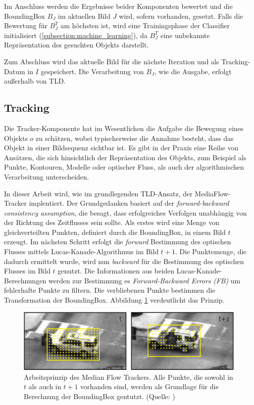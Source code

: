 	Im Anschluss werden die Ergebnisse beider Komponenten bewertet und die BoundingBox $B_J$ im aktuellen Bild $J$ wird, sofern vorhanden, gesetzt. Falls die Bewertung für $B_J^T$ am höchsten ist, wird eine Trainingsphase der Classifier initialisiert (\ref{subsection:machine_learning}), da $B_J^T$ eine unbekannte Repräsentation des gesuchten Objekts darstellt.

	Zum Abschluss wird das aktuelle Bild für die nächste Iteration und als Tracking-Datum in $I$ gespeichert. Die Verarbeitung von $B_J$, wie die Ausgabe, erfolgt außerhalb von TLD.

	\subsection{Tracking}
	\label{subsection:tracking}
	Die Tracker-Komponente hat im Wesentlichen die Aufgabe die Bewegung eines Objekts $o$ zu schätzen, wobei typischerweise die Annahme besteht, dass das Objekt in einer Bildsequenz sichtbar ist. Es gibt in der Praxis eine Reihe von Ansätzen, die sich hinsichtlich der Repräsentation des Objekts, zum Beispiel als Punkte, Kontouren, Modelle oder optischer Fluss, als auch der algorithmischen Verarbeitung unterscheiden.

	In dieser Arbeit wird, wie im grundlegenden TLD-Ansatz, der MediaFlow- Tracker \cite{MFT} implentiert. Der Grundgedanken basiert auf der\textit{ forward-backward consistency assumption}, die besagt, dass erfolgreiches Verfolgen unabhängig von der Richtung des Zeitflusses sein sollte. Als erstes wird eine Menge von gleichverteilten Punkten, definiert durch die BoundingBox, in einem Bild $t$ erzeugt. Im nächsten Schritt erfolgt die \textit{forward} Bestimmung des optischen Flusses mittels Lucas-Kanade-Algorithmus \cite{OPT} im Bild $t+1$. Die Punktemenge, die dadurch ermittelt wurde, wird nun \textit{backward} für die Bestimmung des optischen Flusses im Bild $t$ genutzt. Die Informationen aus beiden Lucas-Kanade-Berechnungen werden zur Bestimmung es \textit{Forward-Backward Errors (FB)} um fehlerhafte Punkte zu filtern. Die verbliebenen Punkte bestimmen die Transformation der BoundingBox. Abbildung \ref{fig:MFT} verdeutlicht das Prinzip.

	\begin{figure}
	\centering{}\includegraphics[scale=0.7]{../pictures/MediaFlow_0.png}\caption[Arbeitsweise des Median Flow Trackers]{Arbeitsprinzip des Median Flow Trackers. Alle Punkte, die sowohl in $t$ als auch in $t+1$ vorhanden sind, werden als Grundlage für die Berechnung der BoundingBox gentutzt. (Quelle: \cite{MFT})\label{fig:MFT} }
	\end{figure}

